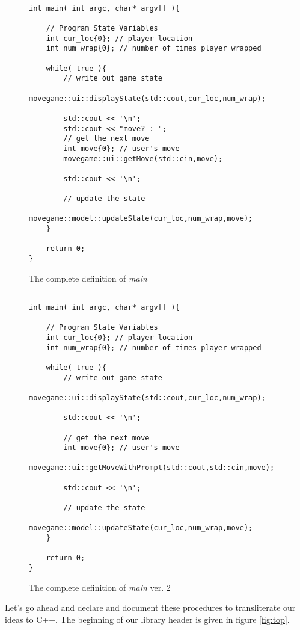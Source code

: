 \documentclass[nobib]{tufte-handout}
\begin{document}
\begin{figure}[!htbp]
\begin{lstlisting}

int main( int argc, char* argv[] ){

	// Program State Variables
	int cur_loc{0}; // player location
	int num_wrap{0}; // number of times player wrapped
	
	while( true ){
		// write out game state
		movegame::ui::displayState(std::cout,cur_loc,num_wrap);		

		std::cout << '\n';
		std::cout << "move? : ";
		// get the next move
		int move{0}; // user's move
		movegame::ui::getMove(std::cin,move);

		std::cout << '\n';		
		
		// update the state
		movegame::model::updateState(cur_loc,num_wrap,move);		
	}

	return 0;
}
\end{lstlisting}
\caption{The complete definition of \textit{main}}
\label{fig:main-final1}
\end{figure}




\begin{figure}[!htbp]
\begin{lstlisting}

int main( int argc, char* argv[] ){

	// Program State Variables
	int cur_loc{0}; // player location
	int num_wrap{0}; // number of times player wrapped
	
	while( true ){
		// write out game state
		movegame::ui::displayState(std::cout,cur_loc,num_wrap);		

		std::cout << '\n';
		
		// get the next move
		int move{0}; // user's move
		movegame::ui::getMoveWithPrompt(std::cout,std::cin,move);

		std::cout << '\n';		
		
		// update the state
		movegame::model::updateState(cur_loc,num_wrap,move);		
	}

	return 0;
}
\end{lstlisting}
\caption{The complete definition of \textit{main} ver. 2}
\label{fig:main-final2}
\end{figure}

Let's go ahead and declare and document these procedures to transliterate our ideas to C++.  The beginning of our library header is given in figure \ref{fig:top}.
\end{document}
